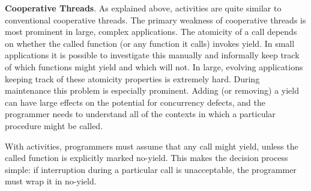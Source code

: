 \documentclass[9pt,preprint]{sigplanconf}
\begin{document}




\textbf{Cooperative Threads}.
As explained above, activities are quite similar to conventional cooperative threads.
The primary weakness of cooperative threads is most prominent in large, complex applications.
The atomicity of a call depends on whether the called function (or any function it calls) invokes yield.
In small applications it is possible to investigate this manually and informally keep track of which functions might yield and which will not.
In large, evolving applications keeping track of these atomicity properties is extremely hard.
During maintenance this problem is especially prominent.
Adding (or removing) a yield can have large effects on the potential for concurrency defects, and the programmer needs to understand all of the contexts in which a particular procedure might be called.

With activities, programmers must assume that any call might yield, unless the called function is explicitly marked no-yield.
This makes the decision process simple: if interruption during a particular call is unacceptable, the programmer must wrap it in no-yield.

\end{document}
